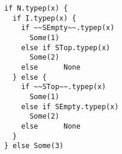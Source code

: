 \begin{lstlisting}[style=reclojureScala]
if N.typep(x) {
  if I.typep(x) {
    if ~~SEmpty~~.typep(x)
      Some(1)
    else if STop.typep(x)
      Some(2)
    else      None
  } else {
    if ~~STop~~.typep(x)
      Some(1)
    else if SEmpty.typep(x)
      Some(2)
    else      None
  }
} else Some(3)
\end{lstlisting}
